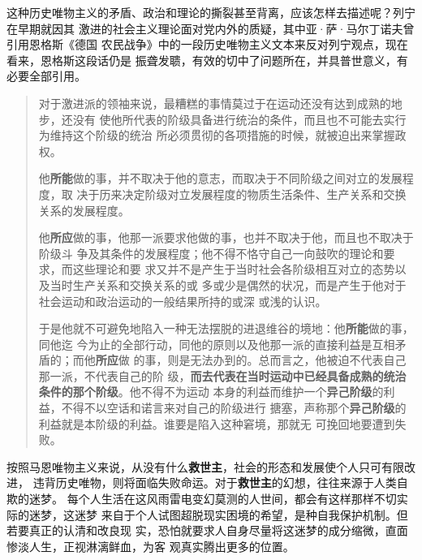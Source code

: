 这种历史唯物主义的矛盾、政治和理论的撕裂甚至背离，应该怎样去描述呢？列宁在早期就因其
激进的社会主义理论面对党内外的质疑，其中亚·萨·马尔丁诺夫曾引用恩格斯《德国
农民战争》中的一段历史唯物主义文本来反对列宁观点，现在看来，恩格斯这段话仍是
振聋发聩，有效的切中了问题所在，并具普世意义，有必要全部引用。

\begin{quotation}
  对于激进派的领袖来说，最糟糕的事情莫过于在运动还没有达到成熟的地步，还没有
  使他所代表的阶级具备进行统治的条件，而且也不可能去实行为维持这个阶级的统治
  所必须贯彻的各项措施的时候，就被迫出来掌握政权。

  他\textbf{所能}做的事，并不取决于他的意志，而取决于不同阶级之间对立的发展程度，取
  决于历来决定阶级对立发展程度的物质生活条件、生产关系和交换关系的发展程度。

  他\textbf{所应}做的事，他那一派要求他做的事，也并不取决于他，而且也不取决于阶级斗
  争及其条件的发展程度；他不得不恪守自己一向鼓吹的理论和要求，而这些理论和要
  求又并不是产生于当时社会各阶级相互对立的态势以及当时生产关系和交换关系的或
  多或少是偶然的状况，而是产生于他对于社会运动和政治运动的一般结果所持的或深
  或浅的认识。

  于是他就不可避免地陷入一种无法摆脱的进退维谷的境地：他\textbf{所能}做的事，同他迄
  今为止的全部行动，同他的原则以及他那一派的直接利益是互相矛盾的；而他\textbf{所应}做
  的事，则是无法办到的。总而言之，他被迫不代表自己那一派，不代表自己的阶
  级，\textbf{而去代表在当时运动中已经具备成熟的统治条件的那个阶级}。他不得不为运动
  本身的利益而维护一个\textbf{异己阶级}的利益，不得不以空话和诺言来对自己的阶级进行
  搪塞，声称那个\textbf{异己阶级}的利益就是本阶级的利益。谁要是陷入这种窘境，那就无
  可挽回地要遭到失败。
\end{quotation}

按照马恩唯物主义来说，从没有什么\textbf{救世主}，社会的形态和发展使个人只可有限改进，
违背历史唯物，则将面临失败命运。对于\textbf{救世主}的幻想，往往来源于人类自欺的迷梦。
每个人生活在这风雨雷电变幻莫测的人世间，都会有这样那样不切实际的迷梦，这迷梦
来自于个人试图超脱现实困境的希望，是种自我保护机制。但若要真正的认清和改良现
实，恐怕就要求人自身尽量将这迷梦的成分缩微，直面惨淡人生，正视淋漓鲜血，为客
观真实腾出更多的位置。




